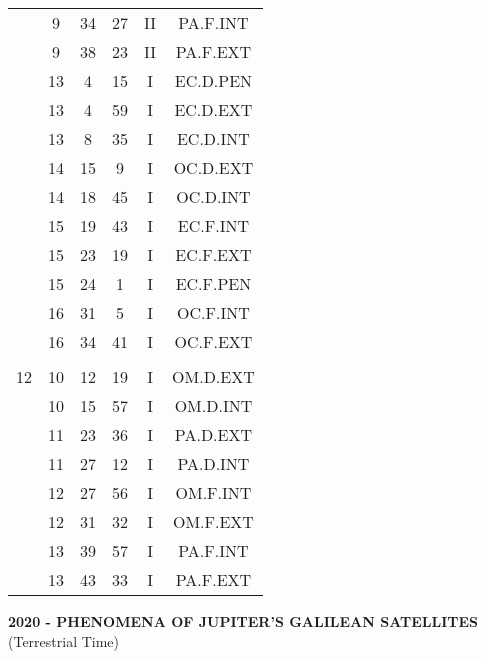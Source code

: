 \documentclass[12pt, a4paper]{article}
\begin{document}
\begin{multicols}{3}
{\begin{tabular}{c c c c c c}
	 	 	 	 & 9 & 34 & 27 & II & PA.F.INT\\%
	 	 	 	 & 9 & 38 & 23 & II & PA.F.EXT\\%
	 	 	 	 & 13 & 4 & 15 & I & EC.D.PEN\\%
	 	 	 	 & 13 & 4 & 59 & I & EC.D.EXT\\%
	 	 	 	 & 13 & 8 & 35 & I & EC.D.INT\\%
	 	 	 	 & 14 & 15 & 9 & I & OC.D.EXT\\%
	 	 	 	 & 14 & 18 & 45 & I & OC.D.INT\\%
	 	 	 	 & 15 & 19 & 43 & I & EC.F.INT\\%
	 	 	 	 & 15 & 23 & 19 & I & EC.F.EXT\\%
	 	 	 	 & 15 & 24 & 1 & I & EC.F.PEN\\%
	 	 	 	 & 16 & 31 & 5 & I & OC.F.INT\\%
	 	 	 	 & 16 & 34 & 41 & I & OC.F.EXT\\%
	 	 	 	 & & & & & \\%
	 	 	 	12 & 10 & 12 & 19 & I & OM.D.EXT\\%
	 	 	 	 & 10 & 15 & 57 & I & OM.D.INT\\%
	 	 	 	 & 11 & 23 & 36 & I & PA.D.EXT\\%
	 	 	 	 & 11 & 27 & 12 & I & PA.D.INT\\%
	 	 	 	 & 12 & 27 & 56 & I & OM.F.INT\\%
	 	 	 	 & 12 & 31 & 32 & I & OM.F.EXT\\%
	 	 	 	 & 13 & 39 & 57 & I & PA.F.INT\\%
	 	 	 	 & 13 & 43 & 33 & I & PA.F.EXT\\%
	 	 \end{tabular}
 	}
\end{multicols}
\pagebreak
\textbf{2020 - PHENOMENA OF JUPITER'S GALILEAN SATELLITES}\\(Terrestrial Time) 
\end{document}
